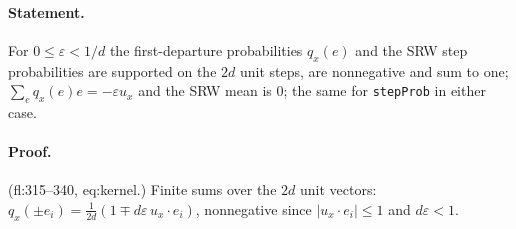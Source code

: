 \paragraph{Statement.} For $0\leq\varepsilon<1/d$ the first-departure probabilities $q_x(e)$ and the SRW step probabilities are supported on the $2d$ unit steps,
are nonnegative and sum to one; $\sum_eq_x(e)e=-\varepsilon u_x$ and the SRW mean is $0$; the same for \texttt{stepProb} in either case.
\paragraph{Proof.} (fl:315--340, eq:kernel.) Finite sums over the $2d$ unit vectors: $q_x(\pm e_i)=\frac1{2d}(1\mp d\varepsilon\,u_x\cdot e_i)$, nonnegative since $|u_x\cdot e_i|\leq1$ and $d\varepsilon<1$.
